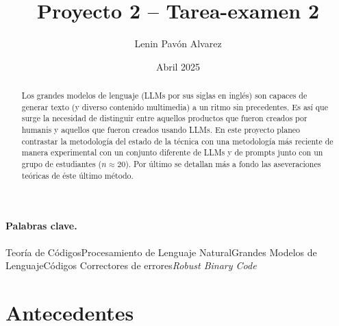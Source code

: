 \documentclass[a4paper,11pt]{article}
\title{Proyecto 2 -- Tarea-examen 2}
\author{
Lenin Pavón Alvarez
}
\date{Abril 2025}
\begin{document}
\maketitle
\begin{abstract}
    Los grandes modelos de lenguaje (LLMs por sus siglas en inglés) son capaces de generar texto (y diverso contenido multimedia) a un ritmo sin precedentes. Es así que surge la necesidad de distinguir entre aquellos productos que fueron creados por humanis y aquellos que fueron creados usando LLMs. En este proyecto planeo contrastar la metodología del estado de la técnica \cite{kirchenbauer_watermark_2024} con una metodología más reciente \cite{chao_watermarking_2025} de manera experimental con un conjunto diferente de LLMs y de prompts junto con un grupo de estudiantes ($n\approx 20$). Por último se detallan más a fondo las aseveraciones teóricas de éste último método.
\end{abstract}
\paragraph{Palabras clave.} Teoría de Códigos\quad Procesamiento de Lenguaje Natural\quad Grandes Modelos de Lenguaje\quad Códigos Correctores de errores\quad \textit{Robust Binary Code}
\tableofcontents
\section{Antecedentes}
\end{document}
